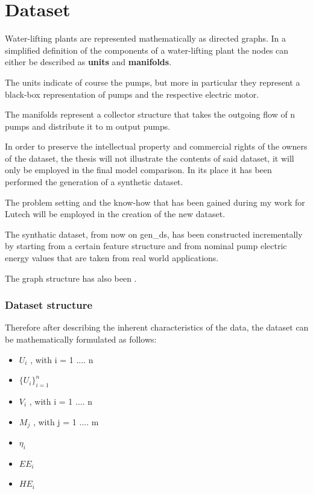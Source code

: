 \section{Dataset}

Water-lifting plants are represented mathematically as directed graphs. In a simplified definition of the components of a water-lifting plant the nodes can either be described as \textbf{units} and \textbf{manifolds}. 

The units indicate of course the pumps, but more in particular they represent a black-box representation of pumps and the respective electric motor. 

The manifolds represent a collector structure that takes the outgoing flow of n pumps and distribute it to m output pumps. 

In order to preserve the intellectual property and commercial rights of the owners of the dataset, the thesis will not illustrate the contents of said dataset, it will only be employed in the final model comparison. 
In its place it has been performed the generation of  a synthetic dataset. 

The problem setting and the know-how that has been gained during my work for Lutech will be employed in the creation of the new dataset.

The synthatic dataset, from now on gen\_ds, has been constructed incrementally by starting from a certain feature structure and from nominal pump electric energy values that are taken from real world applications.  

The graph structure has also been .

\subsubsection{Dataset structure}

Therefore after describing the inherent characteristics of the data, the dataset can be mathematically formulated as follows:

\begin{itemize}
    \item $U_i$ , with i = 1 .... n
    \item $\{U_i\}_{i=1}^n$
    \item $V_i$ , with i = 1 .... n
    \item $M_j$ , with j = 1 .... m
    \item $\eta_i$
    \item $EE_i$
    \item $HE_i$
\end{itemize}

